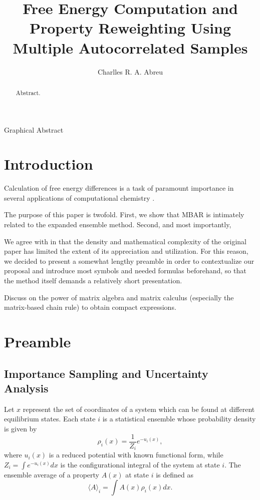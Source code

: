 \documentclass[journal=jctcce,manuscript=article,layout=twocolumn]{achemso}
\author{Charlles R. A. Abreu}
\affiliation{Chemical Engineering Department, Escola de Quimica, Universidade Federal do Rio de Janeiro, Rio de Janeiro, RJ 21941-909, Brazil}
\title{Free Energy Computation and Property Reweighting Using Multiple Autocorrelated Samples}
\begin{document}
\begin{tocentry}
Graphical Abstract
\end{tocentry}

\begin{abstract}
Abstract.
\end{abstract}

\section{Introduction}
\label{sec:introduction}

Calculation of free energy differences is a task of paramount importance in several applications of computational chemistry \cite{Christ_2010, Hansen_2014}.


The purpose of this paper is twofold. First, we show that MBAR is intimately related to the expanded ensemble method. Second, and most importantly, 

We agree with \citeauthor{Shirts_2017} \cite{Shirts_2017} in that the density and mathematical complexity of the original  paper has limited the extent of its appreciation and utilization. For this reason, we decided to present a somewhat lengthy preamble in order to contextualize our proposal and introduce most symbols and needed formulas beforehand, so that the method itself demands a relatively short presentation.

Discuss on the power of matrix algebra and matrix calculus (especially the matrix-based chain rule) to obtain compact expressions. 

\section{Preamble}

\subsection{Importance Sampling and Uncertainty Analysis}
\label{sec:definitions}

Let $x$ represent the set of coordinates of a system which can be found at different equilibrium states. Each state $i$ is a statistical ensemble whose probability density is given by
\begin{equation}
\label{eq:state_prob_density}
\rho_i(x) = \frac{1}{Z_i} e^{-u_i(x)},
\end{equation}
where $u_i(x)$ is a reduced potential \cite{Shirts_2008, Chodera_2011} with known functional form, while $Z_i = \int e^{-u_i(x)}dx$ is the configurational integral of the system at state $i$. The ensemble average of a property $A(x)$ at state $i$ is defined as
\begin{equation}
\label{eq:ensemble average}
\langle A \rangle_i = \int A(x)\rho_i(x)dx.
\end{equation}
\end{document}
